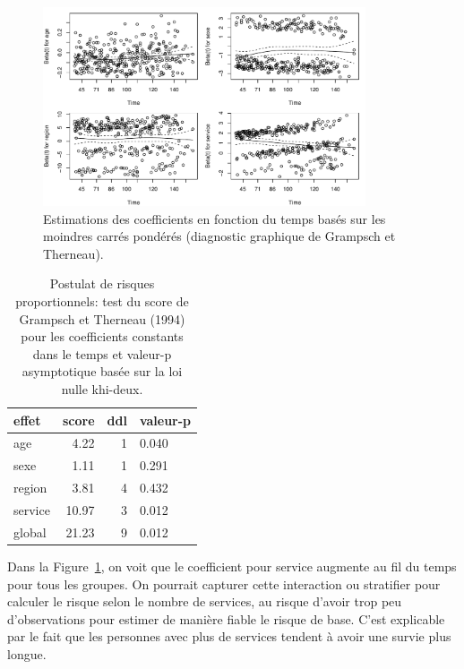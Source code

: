 \documentclass[
  11pt,
  letterpaper,
]{scrbook}
\theoremstyle{definition}
\theoremstyle{remark}
\begin{document}
\begin{figure}[ht!]

{\centering \includegraphics[width=0.85\textwidth,height=\textheight]{survie_files/figure-pdf/fig-coxphhypothese-1.pdf}

}

\caption{\label{fig-coxphhypothese}Estimations des coefficients en
fonction du temps basés sur les moindres carrés pondérés (diagnostic
graphique de Grampsch et Therneau).}

\end{figure}

\hypertarget{tbl-coxphhypothese}{}
\begin{table}
\caption{\label{tbl-coxphhypothese}Postulat de risques proportionnels: test du score de Grampsch et
Therneau (1994) pour les coefficients constants dans le temps et
valeur-p asymptotique basée sur la loi nulle khi-deux. }\tabularnewline

\centering
\begin{tabular}{lrrl}
\toprule
effet & score & ddl & valeur-p\\
\midrule
age & 4.22 & 1 & 0.040\\
sexe & 1.11 & 1 & 0.291\\
region & 3.81 & 4 & 0.432\\
service & 10.97 & 3 & 0.012\\
global & 21.23 & 9 & 0.012\\
\bottomrule
\end{tabular}
\end{table}

Dans la Figure~\ref{fig-coxphhypothese}, on voit que le coefficient pour
service augmente au fil du temps pour tous les groupes. On pourrait
capturer cette interaction ou stratifier pour calculer le risque selon
le nombre de services, au risque d'avoir trop peu d'observations pour
estimer de manière fiable le risque de base. C'est explicable par le
fait que les personnes avec plus de services tendent à avoir une survie
plus longue.
\end{document}
